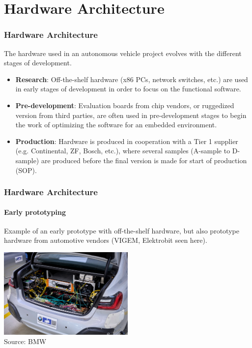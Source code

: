 \section{Hardware Architecture}

\begin{frame}
\frametitle{Hardware Architecture}
The hardware used in an autonomous vehicle project evolves with the different
stages of development.

\begin{itemize}
    \item \textbf{Research}: Off-the-shelf hardware (x86 PCs, network switches, etc.) are used
        in early stages of development in order to focus on the functional
        software.
    \item \textbf{Pre-development}: Evaluation boards from chip vendors, or ruggedized version from
        third parties, are often used in pre-development stages to begin
        the work of optimizing the software for an embedded environment.
    \item \textbf{Production}: Hardware is produced in cooperation with a Tier 1
        supplier (e.g. Continental, ZF, Bosch, etc.), where several samples
        (A-sample to D-sample) are produced before the final version is made
        for start of production (SOP).
\end{itemize}
\end{frame}

\begin{frame}
\frametitle{Hardware Architecture}
\framesubtitle{Early prototyping}
Example of an early prototype with off-the-shelf hardware, but also prototype
hardware from automotive vendors (VIGEM, Elektrobit seen here).
\begin{center}
\includegraphics[width=0.5\textwidth]{images/bmw_vehicle_trunk.jpg}\\
\footnotesize Source: BMW\footnotemark[1]
\end{center}
\end{frame}

